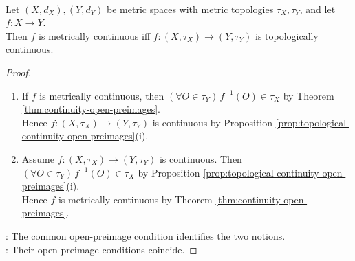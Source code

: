 \begin{corollary} \label{cor:metric-and-topological-continuity-agree} \\
Let $(X,d_X),(Y,d_Y)$ be metric spaces with metric topologies $\tau_X,\tau_Y$, and let $f:X\to Y$.\\
Then $f$ is metrically continuous iff $f:(X,\tau_X)\to(Y,\tau_Y)$ is topologically continuous.
\begin{proof}
\begin{enumerate}[label=\roman*.]
\setlength{\itemsep}{0pt}
\item[$(\Rightarrow)$] If $f$ is metrically continuous, then $(\forall O\in\tau_Y)\,f^{-1}(O)\in\tau_X$ by Theorem \ref{thm:continuity-open-preimages}.\\
Hence $f:(X,\tau_X)\to(Y,\tau_Y)$ is continuous by Proposition \ref{prop:topological-continuity-open-preimages}(i).
\item[$(\Leftarrow)$] Assume $f:(X,\tau_X)\to(Y,\tau_Y)$ is continuous. Then $(\forall O\in\tau_Y)\,f^{-1}(O)\in\tau_X$ by Proposition \ref{prop:topological-continuity-open-preimages}(i).\\
Hence $f$ is metrically continuous by Theorem \ref{thm:continuity-open-preimages}.
\end{enumerate}
: The common open-preimage condition identifies the two notions.\\
: Their open-preimage conditions coincide.
\end{proof}
\end{corollary}


